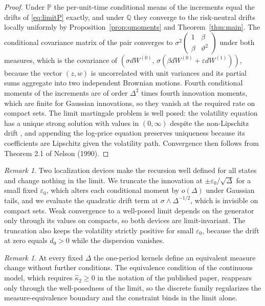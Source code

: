 \documentclass[11pt]{article}
\theoremstyle{remark}
\newtheorem{remark}[theorem]{Remark}
\newcommand{\Pm}{\mathbb{P}}
\newcommand{\Qm}{\mathbb{Q}}
\newcommand{\Dt}{\Delta}
\begin{document}
\begin{proof}
Under $\Pm$ the per-unit-time conditional means of the increments equal the
drifts of \eqref{eq:limitP} exactly, and under $\Qm$ they converge to the
risk-neutral drifts locally uniformly by Proposition~\ref{prop:qmoments}
and Theorem~\ref{thm:main}.
The conditional covariance matrix of the pair converges to
$\sigma^2\begin{pmatrix}1&\beta\\ \beta&\vartheta^2\end{pmatrix}$ under
both measures, which is the covariance of
$(\sigma dW^{(0)},\,\sigma(\beta dW^{(0)}+\varepsilon dW^{(1)}))$, because
the vector $(z,w)$ is uncorrelated with unit variances and its partial
sums aggregate into two independent Brownian motions.
Fourth conditional moments of the increments are of order $\Dt^2$ times
fourth innovation moments, which are finite for Gaussian innovations, so
they vanish at the required rate on compact sets.
The limit martingale problem is well posed: the volatility equation has a
unique strong solution with values in $(0,\infty)$ despite the
non-Lipschitz drift \cite{SeppRakhmonov2023}, and appending the log-price
equation preserves uniqueness because its coefficients are Lipschitz given
the volatility path.
Convergence then follows from Theorem 2.1 of Nelson (1990).
\end{proof}

\begin{remark}\label{rem:trunc}
Two localization devices make the recursion well defined for all states and
change nothing in the limit.
We truncate the innovation at $\pm\varepsilon_0/\sqrt{\Dt}$ for a small
fixed $\varepsilon_0$, which alters each conditional moment by $o(\Dt)$
under Gaussian tails, and we evaluate the quadratic drift term at
$\sigma\wedge\Dt^{-1/2}$, which is invisible on compact sets.
Weak convergence to a well-posed limit depends on the generator only
through its values on compacts, so both devices are limit-invariant.
The truncation also keeps the volatility strictly positive for small
$\varepsilon_0$, because the drift at zero equals $d_0>0$ while the
dispersion vanishes.
\end{remark}

\begin{remark}\label{rem:equiv}
At every fixed $\Dt$ the one-period kernels define an equivalent measure
change without further conditions.
The equivalence condition of the continuous model, which requires
$\hat\kappa_2\ge0$ in the notation of the published paper, reappears only
through the well-posedness of the limit, so the discrete family
regularizes the measure-equivalence boundary and the constraint binds in
the limit alone.
\end{remark}
\end{document}
